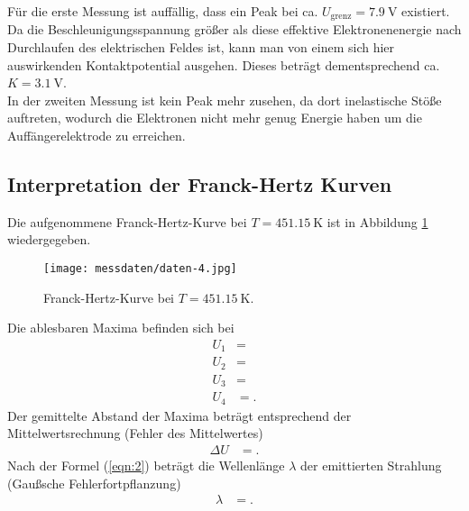 Für die erste Messung ist auffällig, dass ein Peak bei ca. $U_{\text{grenz}} = \SI{7.9}{\volt}$ existiert.
Da die Beschleunigungsspannung größer als diese effektive Elektronenenergie nach Durchlaufen des elektrischen Feldes ist, kann man von einem sich hier auswirkenden Kontaktpotential ausgehen.
Dieses beträgt dementsprechend ca. $K = \SI{3.1}{\volt}$.\\
In der zweiten Messung ist kein Peak mehr zusehen, da dort inelastische Stöße auftreten, wodurch die Elektronen nicht mehr genug Energie haben um die Auffängerelektrode zu erreichen.


\subsection{Interpretation der Franck-Hertz Kurven}
Die aufgenommene Franck-Hertz-Kurve bei $T = \SI{451.15}{\kelvin}$ ist in Abbildung \ref{fig:abb1} wiedergegeben.

\begin{figure}[H]
  \centering
  \texttt{[image: messdaten/daten-4.jpg]}
  \caption{Franck-Hertz-Kurve bei $T = \SI{451.15}{\kelvin}$.}
  \label{fig:abb1}
\end{figure}

Die ablesbaren Maxima befinden sich bei
\begin{align*}
  U_1 &=  \\
  U_2 &=  \\
  U_3 &=  \\
  U_4 &= .
\end{align*}
Der gemittelte Abstand der Maxima beträgt entsprechend der Mittelwertsrechnung (Fehler des Mittelwertes)
\begin{align*}
  \Delta U &= .
\end{align*}
Nach der Formel (\ref{eqn:2}) beträgt die Wellenlänge $\lambda$ der emittierten Strahlung (Gaußsche Fehlerfortpflanzung)
\begin{align*}
  \lambda &= .
\end{align*}

